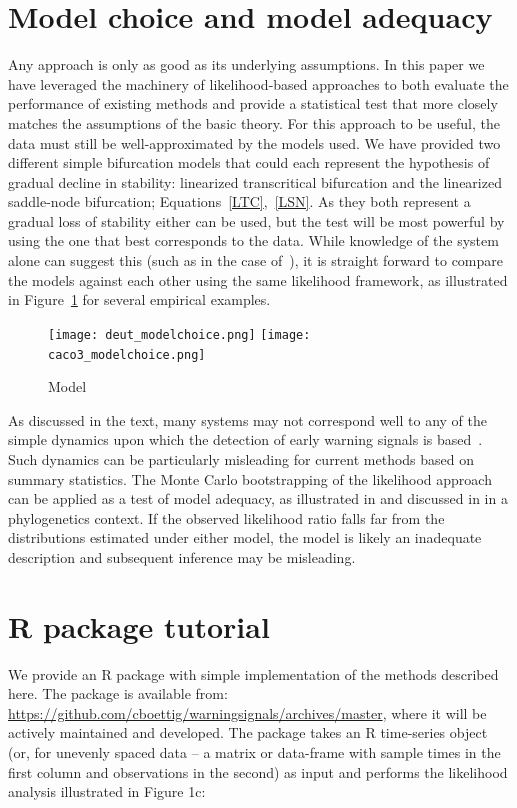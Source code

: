 \documentclass[authoryear, preprint,review,12pt]{elsarticle}
\begin{document}
\section{Model choice and model adequacy}\label{modelchoice}
Any approach is only as good as its underlying assumptions.  In this paper we have leveraged the machinery of likelihood-based approaches to both evaluate the performance of existing methods and provide a statistical test that more closely matches the assumptions of the basic theory.  For this approach to be useful, the data must still be well-approximated by the models used.  We have provided two different simple bifurcation models that could each represent the hypothesis of gradual decline in stability: linearized transcritical bifurcation and the linearized saddle-node bifurcation; Equations~\eqref{LTC},~\eqref{LSN}.  As they both represent a gradual loss of stability either can be used, but the test will be most powerful by using the one that best corresponds to the data.  While knowledge of the system alone can suggest this (such as in the case of~\citet{Drake2010}), it is straight forward to compare the models against each other using the same likelihood framework, as illustrated in Figure~\ref{fig:modelchoice} for several empirical examples.  

\begin{figure}[ht]
\begin{center}
\texttt{[image: deut\_modelchoice.png]}
\texttt{[image: caco3\_modelchoice.png]}
\end{center}
\caption{Model }
\label{fig:modelchoice}
\end{figure}

As discussed in the text, many systems may not correspond well to any of the simple dynamics upon which the detection of early warning signals is based~\citep{Hastings2010}.  Such dynamics can be particularly misleading for current methods based on summary statistics.  The Monte Carlo bootstrapping of the likelihood approach can be applied as a test of model adequacy, as illustrated in \citet{Goldman1993} and discussed in \citet{Sullivan2005b} in a phylogenetics context. If the observed likelihood ratio falls far from the distributions estimated under either model, the model is likely an inadequate description and subsequent inference may be misleading.  



\section{R package tutorial}
We provide an R package with simple implementation of the methods described here.  The package is available from: \href{https://github.com/cboettig/warningsignals/archives/master}{https://github.com/cboettig/warningsignals/archives/master}, where it will be actively maintained and developed.  The package takes an R time-series object (or, for unevenly spaced data -- a matrix or data-frame with sample times in the first column and observations in the second) as input and performs the likelihood analysis illustrated in Figure 1c:
\end{document}
